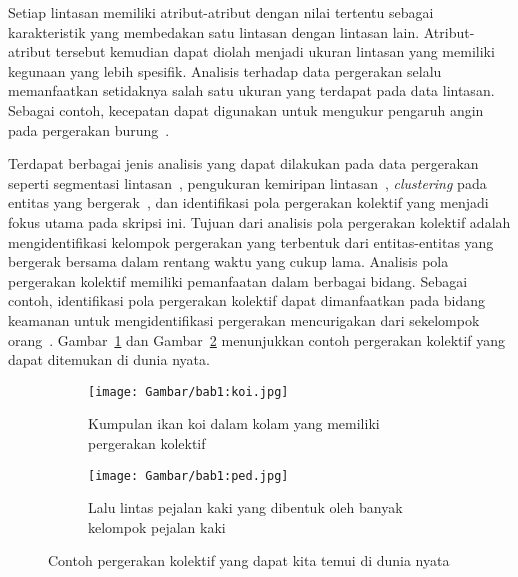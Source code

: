 Setiap lintasan memiliki atribut-atribut dengan nilai tertentu sebagai karakteristik yang membedakan satu lintasan dengan lintasan lain. Atribut-atribut tersebut kemudian dapat diolah menjadi ukuran lintasan yang memiliki kegunaan yang lebih spesifik. Analisis terhadap data pergerakan selalu memanfaatkan setidaknya salah satu ukuran yang terdapat pada data lintasan. Sebagai contoh, kecepatan dapat digunakan untuk mengukur pengaruh angin pada pergerakan burung~\cite{safi:speed}.

\iffalse \lionov{jadiin paragraf baru, kan ini beda topik} \fi

Terdapat berbagai jenis analisis yang dapat dilakukan pada data pergerakan seperti segmentasi lintasan~\cite{mann:01:segmentation}, pengukuran kemiripan lintasan~\cite{rote:01:hausdorff, alt:01:frechet, muller:dtw}, \textit{clustering} pada entitas yang bergerak~\cite{lee:01:clustering}, dan identifikasi pola pergerakan kolektif yang menjadi fokus utama pada skripsi ini. Tujuan dari analisis pola pergerakan kolektif adalah mengidentifikasi kelompok pergerakan yang terbentuk dari entitas-entitas yang bergerak bersama dalam rentang waktu yang cukup lama. Analisis pola pergerakan kolektif memiliki pemanfaatan dalam berbagai bidang. Sebagai contoh, identifikasi pola pergerakan kolektif dapat dimanfaatkan pada bidang keamanan untuk mengidentifikasi pergerakan mencurigakan dari sekelompok orang~\cite{makris:01:security}. Gambar~\ref{bab1:koi} dan Gambar~\ref{bab1:ped} menunjukkan contoh pergerakan kolektif yang dapat ditemukan di dunia nyata.

\begin{figure}[h]
    \centering
    \begin{subfigure}[h]{0.45\textwidth}
        \centering
        \texttt{[image: Gambar/bab1:koi.jpg]}
        \caption{Kumpulan ikan koi dalam kolam yang memiliki pergerakan kolektif\protect\footnotemark[6]}
        \label{bab1:koi}
    \end{subfigure} \hspace{0.25cm}
    \begin{subfigure}[h]{0.45\textwidth}
        \centering
        \texttt{[image: Gambar/bab1:ped.jpg]}
        \caption{Lalu lintas pejalan kaki yang dibentuk oleh banyak kelompok pejalan kaki\protect\footnotemark[7]}
        \label{bab1:ped}
    \end{subfigure}
    \caption[Pergerakan kolektif dunia nyata]{Contoh pergerakan kolektif yang dapat kita temui di dunia nyata}
    \label{bab1:collective-movement}
\end{figure}

